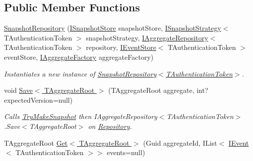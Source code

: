 \subsection*{Public Member Functions}
\begin{DoxyCompactItemize}
\item 
\hyperlink{classCqrs_1_1Snapshots_1_1SnapshotRepository_afb7a64a747064d1f1fa1f58e36d05d78_afb7a64a747064d1f1fa1f58e36d05d78}{Snapshot\+Repository} (\hyperlink{interfaceCqrs_1_1Snapshots_1_1ISnapshotStore}{I\+Snapshot\+Store} snapshot\+Store, \hyperlink{interfaceCqrs_1_1Snapshots_1_1ISnapshotStrategy}{I\+Snapshot\+Strategy}$<$ T\+Authentication\+Token $>$ snapshot\+Strategy, \hyperlink{interfaceCqrs_1_1Domain_1_1IAggregateRepository}{I\+Aggregate\+Repository}$<$ T\+Authentication\+Token $>$ repository, \hyperlink{interfaceCqrs_1_1Events_1_1IEventStore}{I\+Event\+Store}$<$ T\+Authentication\+Token $>$ event\+Store, \hyperlink{interfaceCqrs_1_1Domain_1_1Factories_1_1IAggregateFactory}{I\+Aggregate\+Factory} aggregate\+Factory)
\begin{DoxyCompactList}\small\item\em Instantiates a new instance of \hyperlink{classCqrs_1_1Snapshots_1_1SnapshotRepository_afb7a64a747064d1f1fa1f58e36d05d78_afb7a64a747064d1f1fa1f58e36d05d78}{Snapshot\+Repository$<$\+T\+Authentication\+Token$>$}. \end{DoxyCompactList}\item 
void \hyperlink{classCqrs_1_1Snapshots_1_1SnapshotRepository_aac1a574562f8c6134d02a44cd10b8afa_aac1a574562f8c6134d02a44cd10b8afa}{Save$<$ T\+Aggregate\+Root $>$} (T\+Aggregate\+Root aggregate, int? expected\+Version=null)
\begin{DoxyCompactList}\small\item\em Calls \hyperlink{classCqrs_1_1Snapshots_1_1SnapshotRepository_a82ef7d630bd09e02b573658ab8d909dd_a82ef7d630bd09e02b573658ab8d909dd}{Try\+Make\+Snapshot} then I\+Aggregate\+Repository$<$\+T\+Authentication\+Token$>$.\+Save$<$\+T\+Aggregate\+Root$>$ on \hyperlink{classCqrs_1_1Snapshots_1_1SnapshotRepository_a64b1457cd45056fb7affd2aa8cd07d9e_a64b1457cd45056fb7affd2aa8cd07d9e}{Repository}. \end{DoxyCompactList}\item 
T\+Aggregate\+Root \hyperlink{classCqrs_1_1Snapshots_1_1SnapshotRepository_acdbea47afc87de1da613a6eff3ceef0f_acdbea47afc87de1da613a6eff3ceef0f}{Get$<$ T\+Aggregate\+Root $>$} (Guid aggregate\+Id, I\+List$<$ \hyperlink{interfaceCqrs_1_1Events_1_1IEvent}{I\+Event}$<$ T\+Authentication\+Token $>$$>$ events=null)
$$
\end{DoxyCompactItemize}
